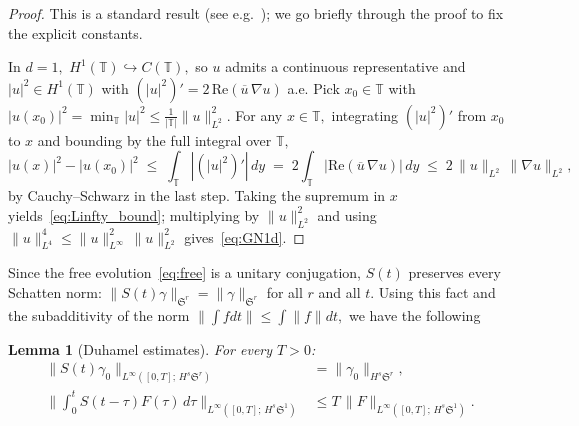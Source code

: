 \documentclass[11pt]{amsart}
\newtheorem{lemma}[theorem]{Lemma}
\theoremstyle{definition}
\newcommand{\T}{\mathbb{T}}
\newcommand{\Sp}{\mathfrak{S}}
\begin{document}
\begin{proof}
This is a standard result (see e.g.~\cite[\S 8.2]{Brezis2011}); we go briefly through the proof to fix the explicit constants.

In $d=1,$ $H^1(\T)\hookrightarrow C(\T),$ so $u$ admits a continuous representative and $|u|^2\in H^1(\T)$ with $(|u|^2)'=2\,\mathrm{Re}(\overline{u}\,\nabla u)$ a.e. Pick $x_0\in\T$ with $|u(x_0)|^2=\min_\T|u|^2\le\tfrac{1}{|\T|}\|u\|_{L^2}^2.$ For any $x\in\T,$ integrating $(|u|^2)'$  from $x_0$ to $x$ and bounding by the full integral over $\T,$
\[
  |u(x)|^2 - |u(x_0)|^2
  \;\le\; \int_\T |(|u|^2)'|\,dy
  \;=\; 2\int_\T |\mathrm{Re}(\overline{u}\,\nabla u)|\,dy
  \;\le\; 2\,\|u\|_{L^2}\,\|\nabla u\|_{L^2},
\]
by Cauchy--Schwarz in the last step. Taking the supremum in $x$ yields~\eqref{eq:Linfty_bound}; multiplying by $\|u\|_{L^2}^2$ and using $\|u\|_{L^4}^4\le\|u\|_{L^\infty}^2\,\|u\|_{L^2}^2$ gives~\eqref{eq:GN1d}.
\end{proof}

\medskip

Since the free evolution~\eqref{eq:free} is a unitary conjugation, $S(t)$ preserves every Schatten norm: $\|S(t)\gamma\|_{\Sp^r}=\|\gamma\|_{\Sp^r}$ for all $r$ and all $t$. Using this fact and the subadditivity of the norm $\|\int f dt\| \leq \int \|f\|dt,$ we have the following

\begin{lemma}[Duhamel estimates]
\label{lem:Duhamel}
For every $T>0$:
\begin{align}
  \|S(t)\gamma_0\|_{L^\infty([0,T];\,H^s\Sp^r)}
  &= \|\gamma_0\|_{H^s\Sp^r},
  \label{eq:free_iso}\\[4pt]
  \biggl\|\int_0^t S(t-\tau)F(\tau)\,d\tau
  \biggr\|_{L^\infty([0,T];\,H^s\Sp^1)}
  &\le T\,
  \|F\|_{L^\infty([0,T];\,H^s\Sp^1)}.
  \label{eq:Duh_Linfty}
\end{align}
\end{lemma}
\end{document}
